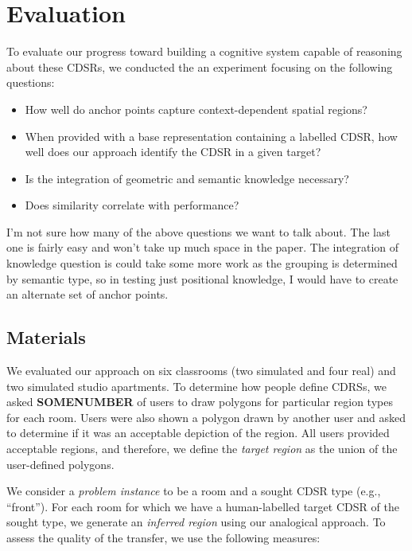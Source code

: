 \section{Evaluation}\label{sec:evaluation}

To evaluate our progress toward building a cognitive system capable of reasoning about these CDSRs, we conducted the an experiment focusing on the following questions:
\begin{itemize}
\item{How well do anchor points capture context-dependent spatial regions?}
\item{When provided with a base representation containing a labelled CDSR, how well does our approach identify the CDSR in a given target?}
\item{Is the integration of geometric and semantic knowledge necessary?}
\item{Does similarity correlate with performance?}
\end{itemize}

I'm not sure how many of the above questions we want to talk about. The last one is fairly easy and won't take up much space in the paper. The integration of knowledge question is could take some more work as the grouping is determined by semantic type, so in testing just positional knowledge,  I would have to create an alternate set of anchor points.

\subsection{Materials}
We evaluated our approach on six classrooms (two simulated and four real) and two simulated studio apartments. To determine how people define CDRSs, we asked \textbf{SOMENUMBER} of users to draw polygons for particular region types for each room. Users were also shown a polygon drawn by another user and asked to determine if it was an acceptable depiction of the region. All users provided acceptable regions, and therefore, we define the \textit{target region} as the union of the user-defined polygons.


We consider a \textit{problem instance} to be a room and a sought CDSR type (e.g., ``front''). For each room for which we have a human-labelled target CDSR of the sought type, we generate an \textit{inferred region} using our analogical approach. To assess the quality of the transfer, we use the following measures:


